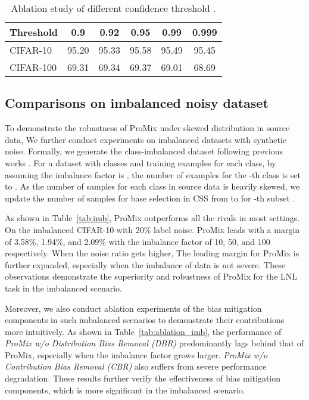 \documentclass{article}
\begin{document}
\begin{table}[!t]
    \centering
    \small
\begin{tabular}{l|ccccc}
        \toprule
        Threshold  & 0.9  & 0.92  & 0.95  & 0.99 & 0.999 \\
        \midrule
        CIFAR-10 & 95.20& 95.33& 95.58& 95.49& 95.45 \\
        CIFAR-100 & 69.31& 69.34& 69.37& 69.01& 68.69\\
        \bottomrule
    \end{tabular}
    \caption{Ablation study of different confidence threshold .}
    \label{tab:ablation_tau}
\end{table}



\subsection{Comparisons on imbalanced noisy dataset}\label{imb:result}
To demonstrate the robustness of ProMix under skewed distribution in source data, We further conduct experiments on  imbalanced datasets with synthetic noise.
Formally, we generate the class-imbalanced dataset following previous works \cite{DBLP:conf/pakdd/WeiSLZ22}. For a dataset with  classes and  training examples for each class, by assuming the imbalance factor is , the number of examples for the -th class is set to . As the number of samples for each class in source data is heavily skewed, we update the number of samples for base selection in CSS from  to  for -th subset .


As shown in Table~\ref{tab:imb}, ProMix outperforms all the rivals in most settings. On the imbalanced CIFAR-10 with 20\% label noise. ProMix leads with a margin of 3.58\%, 1.94\%, and 2.09\% with the imbalance factor of 10, 50, and 100 respectively. When the noise ratio gets higher, The leading margin for ProMix is further expanded, especially when the imbalance of data is not severe. These observations demonstrate the superiority and robustness of ProMix for the LNL task in the imbalanced scenario. 

Moreover, we also conduct ablation experiments of the bias mitigation components in such imbalanced scenarios to demonstrate their contributions more intuitively. As shown in Table~\ref{tab:ablation_imb}, the performance of \emph{ProMix w/o Distribution Bias Removal (DBR)} predominantly lags behind that of ProMix, especially when the imbalance factor grows larger. \emph{ProMix w/o Contribution Bias Removal (CBR)} also suffers from severe performance degradation. These results further verify the effectiveness of bias mitigation components, which is more significant in the imbalanced scenario. 
\end{document}
